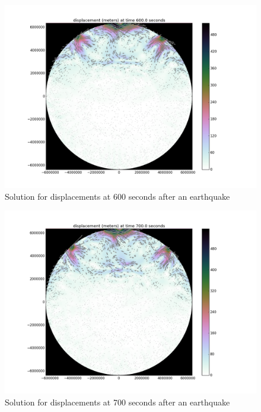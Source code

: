 \documentclass[12pt]{article}
\begin{document}
\begin{figure}
\includegraphics[scale=0.4]{figures/600s}
\centering
\caption{Solution for displacements at 600 seconds after an earthquake}
\end{figure}

\begin{figure}
\includegraphics[scale=0.4]{figures/700s}
\centering
\caption{Solution for displacements at 700 seconds after an earthquake}
\end{figure}
\end{document}

